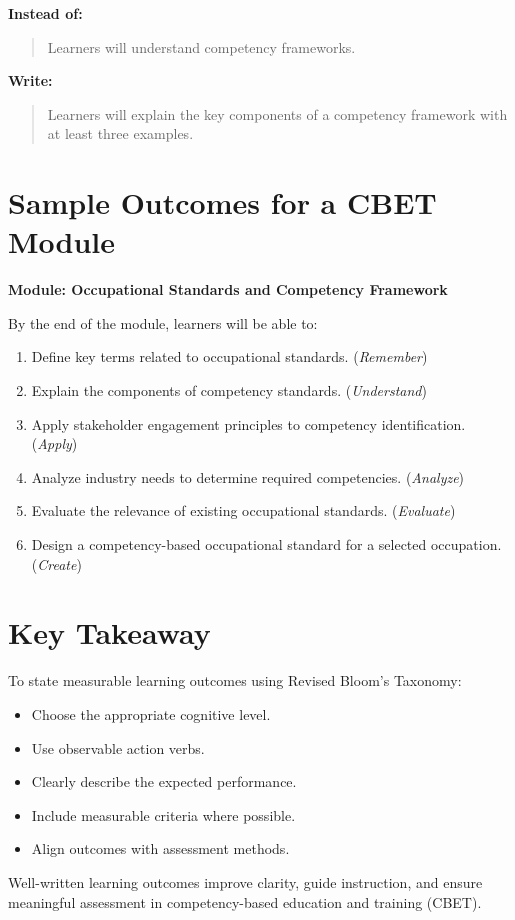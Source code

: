 \documentclass[12pt]{article}
\begin{document}
\textbf{Instead of:}

\begin{quote}
Learners will understand competency frameworks.
\end{quote}

\textbf{Write:}

\begin{quote}
Learners will explain the key components of a competency framework with at least three examples.
\end{quote}

\section{Sample Outcomes for a CBET Module}

\textbf{Module: Occupational Standards and Competency Framework}

By the end of the module, learners will be able to:

\begin{enumerate}
    \item Define key terms related to occupational standards. (\textit{Remember})
    \item Explain the components of competency standards. (\textit{Understand})
    \item Apply stakeholder engagement principles to competency identification. (\textit{Apply})
    \item Analyze industry needs to determine required competencies. (\textit{Analyze})
    \item Evaluate the relevance of existing occupational standards. (\textit{Evaluate})
    \item Design a competency-based occupational standard for a selected occupation. (\textit{Create})
\end{enumerate}

\section{Key Takeaway}

To state measurable learning outcomes using Revised Bloom's Taxonomy:

\begin{itemize}
    \item Choose the appropriate cognitive level.
    \item Use observable action verbs.
    \item Clearly describe the expected performance.
    \item Include measurable criteria where possible.
    \item Align outcomes with assessment methods.
\end{itemize}

Well-written learning outcomes improve clarity, guide instruction, and ensure meaningful assessment in competency-based education and training (CBET).
\end{document}
